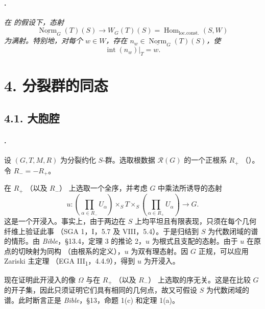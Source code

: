 \paragraph{.}
\textit{在  的假设下，态射}
\[
  \underline{\operatorname{Norm}}_G(T)(S)
  \longrightarrow
  W_G(T)(S)
  =
  \operatorname{Hom}_{\mathrm{loc.const.}}(S,W)
\]
\textit{为满射。特别地，对每个 \(w\in W\)，存在 \(n_w\in\underline{\operatorname{Norm}}_G(T)(S)\)，使}
\[
  \operatorname{int}(n_w)|_T=w.
\]

\section*{4. 分裂群的同态}

\subsection*{4.1. 大胞腔}

\paragraph{.}
设 \((G,T,M,R)\) 为分裂约化 \(S\)-群。选取根数据 \(\mathcal R(G)\) 的一个正根系 \(R_+\) \textup{（）}。令 \(R_-=-R_+\)。

在 \(R_+\) \textup{（以及 \(R_-\)）} 上选取一个全序，并考虑 \(G\) 中乘法所诱导的态射
\[
  u:
  \left(\prod_{\alpha\in R_-}U_\alpha\right)
  \times_S T
  \times_S
  \left(\prod_{\alpha\in R_+}U_\alpha\right)
  \longrightarrow G.
\]
这是一个开浸入。事实上，由于两边在 \(S\) 上均平坦且有限表现，只须在每个几何纤维上验证此事 \textup{（SGA 1，I，5.7 及 VIII，5.4）}。于是归结到 \(S\) 为代数闭域的谱的情形。由 \emph{Bible}，\S13.4，定理 3 的推论 2，\(u\) 为根式且支配的态射。由于 \(u\) 在原点的切映射为同构 \textup{（由根系的定义）}，\(u\) 为双有理态射。因 \(G\) 正规，可以应用 Zariski 主定理 \textup{（EGA III\textsubscript{1}，4.4.9）}，得到 \(u\) 为开浸入。

现在证明此开浸入的像 \(\Omega\) 与在 \(R_+\) \textup{（以及 \(R_-\)）} 上选取的序无关。这是在比较 \(G\) 的开子集，因此只须证明它们具有相同的几何点，故又可假设 \(S\) 为代数闭域的谱。此时断言正是 \emph{Bible}，\S13，命题 1(c) 和定理 1(a)。

